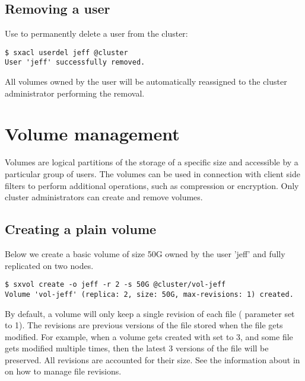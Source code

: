 \subsection{Removing a user}
Use  to permanently delete a user from the cluster:
\begin{lstlisting}
$ sxacl userdel jeff @cluster
User 'jeff' successfully removed.
\end{lstlisting}
All volumes owned by the user will be automatically reassigned to the
cluster administrator performing the removal.

\section{Volume management} \label{sec:volumes}
Volumes are logical partitions of the \SX storage of a specific size and accessible
by a particular group of users. The volumes can be used in connection with client
side filters to perform additional operations, such as compression or encryption.
Only cluster administrators can create and remove volumes.

\subsection{Creating a plain volume}
Below we create a basic volume of size 50G owned by the user 'jeff' and fully replicated on two nodes.
\begin{lstlisting}
$ sxvol create -o jeff -r 2 -s 50G @cluster/vol-jeff
Volume 'vol-jeff' (replica: 2, size: 50G, max-revisions: 1) created.
\end{lstlisting}
By default, a volume will only keep a single revision of each file (
parameter set to 1). The revisions are previous versions of the file stored when the file
gets modified. For example, when a volume gets created with  set to
3, and some file gets modified multiple times, then the latest 3 versions of the file will
be preserved. All revisions are accounted for their size. See the information about
 in  on how to manage file revisions.

